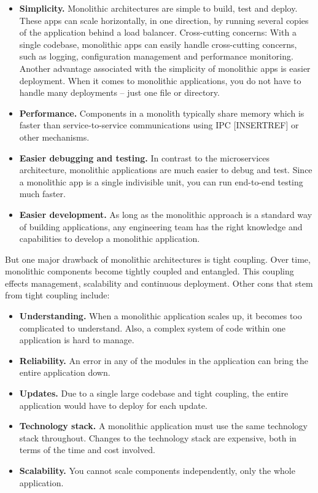 \begin{itemize}
    \item \textbf{Simplicity.} Monolithic architectures are simple to build, test and deploy.
    These apps can scale horizontally, in one direction, by running several copies of the application behind a load balancer.
    Cross-cutting concerns: With a single codebase, monolithic apps can easily handle cross-cutting concerns, such as logging,
    configuration management and performance monitoring.
    Another advantage associated with the simplicity of monolithic apps is easier deployment.
    When it comes to monolithic applications, you do not have to handle many deployments – just one file or directory.
    \item \textbf{Performance.} Components in a monolith typically share memory which is faster than service-to-service communications using
    IPC [INSERTREF] or other mechanisms.
    \item \textbf{Easier debugging and testing.}
    In contrast to the microservices architecture, monolithic applications are much easier to debug and test.
    Since a monolithic app is a single indivisible unit, you can run end-to-end testing much faster.
    \item \textbf{Easier development.} As long as the monolithic approach is a standard way of building applications,
    any engineering team has the right knowledge and capabilities to develop a monolithic application.
\end{itemize}
But one major drawback of monolithic architectures is tight coupling.
Over time, monolithic components become tightly coupled and entangled.
This coupling effects management, scalability and continuous deployment.
Other cons that stem from tight coupling include:

\begin{itemize}
    \item \textbf{Understanding.} When a monolithic application scales up, it becomes too complicated to understand.
    Also, a complex system of code within one application is hard to manage.
    \item \textbf{Reliability.} An error in any of the modules in the application can bring the entire application down.
    \item \textbf{Updates.} Due to a single large codebase and tight coupling, the entire application would have to deploy
    for each update.
    \item \textbf{Technology stack.} A monolithic application must use the same technology stack throughout.
    Changes to the technology stack are expensive, both in terms of the time and cost involved.
    \item \textbf{Scalability.} You cannot scale components independently, only the whole application.
\end{itemize}

